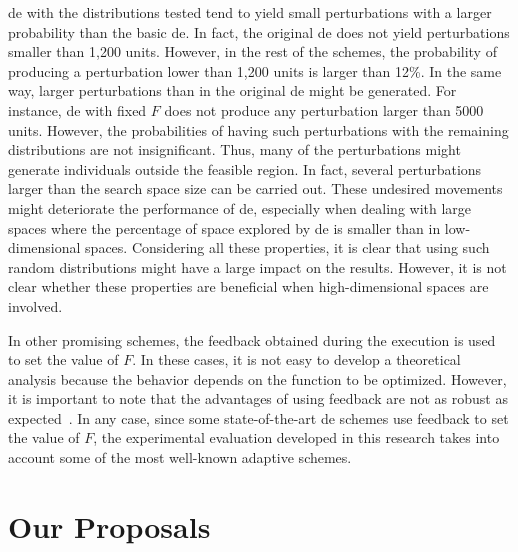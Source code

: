 \documentclass[review,3p]{elsarticle}
\newcommand{\DE}{{\sc de}}
\begin{document}
\DE{} with the distributions tested tend to yield small perturbations with a larger probability than the basic \DE{}.
%
In fact, the original \DE{} does not yield perturbations smaller than 1,200 units.
%
However, in the rest of the schemes, the probability of producing a perturbation lower than 1,200 units is larger than 12\%.
%
In the same way, larger perturbations than in the original \DE{} might be generated.
%
For instance, \DE{} with fixed $F$ does not produce any perturbation larger than 5000 units.
%
However, the probabilities of having such perturbations with the remaining distributions are not insignificant.
%
Thus, many of the perturbations might generate individuals outside the feasible region.
%
In fact, several perturbations larger than the search space size can be carried out.
%
These undesired movements might deteriorate the performance of \DE{}, especially when dealing with large spaces where the
percentage of space explored by \DE{} is smaller than in low-dimensional spaces.
%
Considering all these properties, it is clear that using such random distributions might have a large impact on the results.
%
However, it is not clear whether these properties are beneficial when high-dimensional spaces are involved.

In other promising schemes, the feedback obtained during the execution is used to set the value of $F$.
%
In these cases, it is not easy to develop a theoretical analysis because the behavior depends on the function to be optimized.
%
However, it is important to note that the advantages of using feedback are not as robust as expected~\cite{Zielinski:08,Segura:14}.
%
In any case, since some state-of-the-art \DE{} schemes use feedback to set the value of $F$,
the experimental evaluation developed in this research takes into account some of the most well-known adaptive schemes.

\section{Our Proposals}
\label{sec:proposal}
\end{document}
